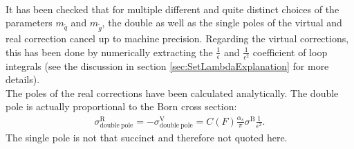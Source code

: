 \\
It has been checked that for multiple different and quite distinct choices of the parameters $m_{\tilde{q}}$ and $m_{\tilde{g}}$, the double as well as the single poles of the virtual and real correction cancel up to machine precision. Regarding the virtual corrections, this has been done by numerically extracting the $\frac{1}{\epsilon}$ and $\frac{1}{\epsilon^2}$ coefficient of loop integrals (see the discussion in section \ref{sec:SetLambdaExplanation} for more details).\\
The poles of the real corrections have been calculated analytically. The double pole is actually proportional to the Born cross section:
\begin{align}
\sigma^{\mathrm{R}}_{\mathrm{double\ pole}} = -\sigma^{\mathrm{V}}_{\mathrm{double\ pole}} = C(F)\frac{\alpha_s}{\pi}\sigma^{\mathrm{B}} \frac{1}{\epsilon^2}.
\end{align}
The single pole is not that succinct and therefore not quoted here.

